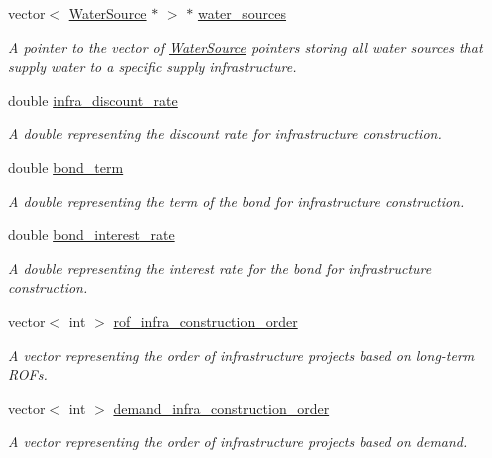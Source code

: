 \begin{DoxyCompactItemize}
vector$<$ \mbox{\hyperlink{classWaterSource}{Water\+Source}} $\ast$ $>$ $\ast$ \mbox{\hyperlink{classInfrastructureManager_a2b8810958d40b9c80d299c6db31715e2}{water\+\_\+sources}}
\begin{DoxyCompactList}\small\item\em A pointer to the vector of \mbox{\hyperlink{classWaterSource}{Water\+Source}} pointers storing all water sources that supply water to a specific supply infrastructure. \end{DoxyCompactList}\item 
double \mbox{\hyperlink{classInfrastructureManager_a44099d2523ff67773ffb853e2c9871b3}{infra\+\_\+discount\+\_\+rate}}
\begin{DoxyCompactList}\small\item\em A double representing the discount rate for infrastructure construction. \end{DoxyCompactList}\item 
double \mbox{\hyperlink{classInfrastructureManager_a6c8010bc7c65fac8411431e5c7a8d3e4}{bond\+\_\+term}}
\begin{DoxyCompactList}\small\item\em A double representing the term of the bond for infrastructure construction. \end{DoxyCompactList}\item 
double \mbox{\hyperlink{classInfrastructureManager_ab8ddaa0ed220e29bc296470b7a905a3b}{bond\+\_\+interest\+\_\+rate}}
\begin{DoxyCompactList}\small\item\em A double representing the interest rate for the bond for infrastructure construction. \end{DoxyCompactList}\item 
vector$<$ int $>$ \mbox{\hyperlink{classInfrastructureManager_a21b02e6d9ca7f90cfb289a48cec723cb}{rof\+\_\+infra\+\_\+construction\+\_\+order}}
\begin{DoxyCompactList}\small\item\em A vector representing the order of infrastructure projects based on long-\/term R\+O\+Fs. \end{DoxyCompactList}\item 
vector$<$ int $>$ \mbox{\hyperlink{classInfrastructureManager_a9b2adee9527d11de87069901e86b540a}{demand\+\_\+infra\+\_\+construction\+\_\+order}}
\begin{DoxyCompactList}\small\item\em A vector representing the order of infrastructure projects based on demand. \end{DoxyCompactList}\item 

\end{DoxyCompactItemize}
